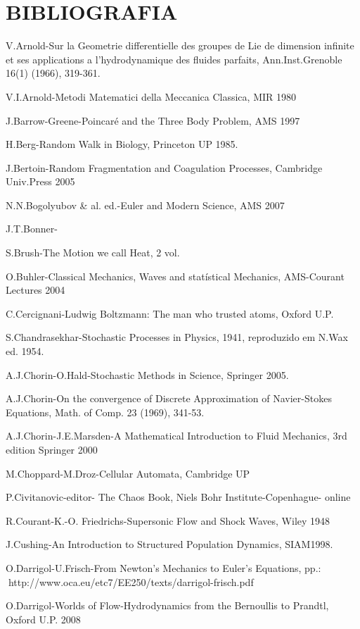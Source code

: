 \section{BIBLIOGRAFIA}

V.Arnold-Sur la Geometrie differentielle des groupes de Lie de dimension infinite et ses applications a l’hydrodynamique des fluides parfaits, Ann.Inst.Grenoble 16(1) (1966),
319-361.

V.I.Arnold-Metodi Matematici della Meccanica Classica, MIR 1980

J.Barrow-Greene-Poincaré and the Three Body Problem, AMS 1997

H.Berg-Random Walk in Biology, Princeton UP 1985.

J.Bertoin-Random Fragmentation and Coagulation Processes, Cambridge Univ.Press 2005

N.N.Bogolyubov \& al. ed.-Euler and Modern Science, AMS 2007

J.T.Bonner-

S.Brush-The Motion we call Heat, 2 vol.

O.Buhler-Classical Mechanics, Waves and statístical Mechanics, AMS-Courant Lectures 2004

C.Cercignani-Ludwig Boltzmann: The man who trusted atoms, Oxford U.P.

S.Chandrasekhar-Stochastic Processes in Physics, 1941, reproduzido em N.Wax ed. 1954.

A.J.Chorin-O.Hald-Stochastic Methods in Science, Springer 2005.

A.J.Chorin-On the convergence of Discrete Approximation of Navier-Stokes Equations, Math. of Comp. 23 (1969), 341-53.

A.J.Chorin-J.E.Marsden-A Mathematical Introduction to Fluid Mechanics, 3rd edition Springer 2000

M.Choppard-M.Droz-Cellular Automata, Cambridge UP

P.Civitanovic-editor- The Chaos Book, Niels Bohr Institute-Copenhague- online

R.Courant-K.-O. Friedrichs-Supersonic Flow and Shock Waves, Wiley 1948

J.Cushing-An Introduction to Structured Population Dynamics, SIAM1998.

O.Darrigol-U.Frisch-From Newton’s Mechanics to Euler’s Equations, pp.: http://www.oca.eu/etc7/EE250/texts/darrigol-frisch.pdf

O.Darrigol-Worlds of Flow-Hydrodynamics from the Bernoullis to Prandtl, Oxford U.P. 2008

